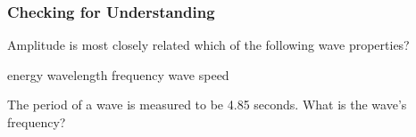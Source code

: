\documentclass[]{exam}
\begin{document}
\begin{questions}











\clearpage

\begin{EnvUplevel}
    \subsubsection*{Checking for Understanding}
\end{EnvUplevel}

\question
Amplitude is most closely related which of the following wave properties?

\begin{randomizechoices}
    \correctchoice energy
    \choice wavelength
    \choice frequency
    \choice wave speed
\end{randomizechoices}

\question \label{XGViXs}
The period of a wave is measured to be 4.85 seconds. What is the wave's frequency?



\end{questions}
\end{document}
